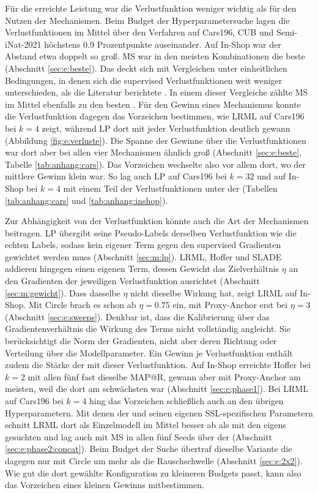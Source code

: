 Für die erreichte Leistung war die Verlustfunktion weniger wichtig als für den Nutzen der Mechanismen. Beim Budget der Hyperparametersuche lagen die Verlustfunktionen im Mittel über den Verfahren auf Cars196, \ac{CUB} und Semi-iNat-2021 höchstens \num{0.9} Prozentpunkte auseinander. Auf In-Shop war der Abstand etwa doppelt so groß. \ac{MS} war in den meisten Kombinationen die beste (Abschnitt \ref{sec:e:beste}). Das deckt sich mit Vergleichen unter einheitlichen Bedingungen, in denen sich die supervised Verlustfunktionen weit weniger unterschieden, als die Literatur berichtete \cite{musgrave_metric_2020, roth_revisiting_2020}. In einem dieser Vergleiche zählte \ac{MS} im Mittel ebenfalls zu den besten \cite{roth_revisiting_2020}. Für den Gewinn eines Mechanismus konnte die Verlustfunktion dagegen das Vorzeichen bestimmen, wie \ac{LRML} auf Cars196 bei $k=4$ zeigt, während \ac{LP} dort mit jeder Verlustfunktion deutlich gewann (Abbildung \ref{fig:e:verluste}). Die Spanne der Gewinne über die Verlustfunktionen war dort aber bei allen vier Mechanismen ähnlich groß (Abschnitt \ref{sec:e:beste}, Tabelle \ref{tab:anhang:cars}). Das Vorzeichen wechselte also vor allem dort, wo der mittlere Gewinn klein war. So lag auch \ac{LP} auf Cars196 bei $k=32$ und auf In-Shop bei $k=4$ mit einem Teil der Verlustfunktionen unter der \UEBL (Tabellen \ref{tab:anhang:cars} und \ref{tab:anhang:inshop}).

Zur Abhängigkeit von der Verlustfunktion könnte auch die Art der Mechanismen beitragen. \ac{LP} übergibt seine Pseudo-Labels derselben Verlustfunktion wie die echten Labels, sodass kein eigener Term gegen den supervised Gradienten gewichtet werden muss (Abschnitt \ref{sec:m:lp}). \ac{LRML}, Hoffer und \ac{SLADE} addieren hingegen einen eigenen Term, dessen Gewicht das Zielverhältnis $\eta$ an den Gradienten der jeweiligen Verlustfunktion ausrichtet (Abschnitt \ref{sec:m:gewicht}). Dass dasselbe $\eta$ nicht dieselbe Wirkung hat, zeigt \ac{LRML} auf In-Shop. Mit Circle brach es schon ab $\eta=\num{0.75}$ ein, mit Proxy-Anchor erst bei $\eta=3$ (Abschnitt \ref{sec:e:sweeps}). Denkbar ist, dass die Kalibrierung über das Gradientenverhältnis die Wirkung des Terms nicht vollständig angleicht. Sie berücksichtigt die Norm der Gradienten, nicht aber deren Richtung oder Verteilung über die Modellparameter. Ein Gewinn je Verlustfunktion enthält zudem die Stärke der \UEBL mit dieser Verlustfunktion. Auf In-Shop erreichte Hoffer bei $k=2$ mit allen fünf fast dieselbe \ac{MAP@R}, gewann aber mit Proxy-Anchor am meisten, weil die \UEBL dort am schwächsten war (Abschnitt \ref{sec:e:phase1}). Bei \ac{LRML} auf Cars196 bei $k=4$ hing das Vorzeichen schließlich auch an den übrigen Hyperparametern. Mit denen der \UEBL und seinen eigenen \ac{SSL}-spezifischen Parametern schnitt \ac{LRML} dort als Einzelmodell im Mittel besser ab als mit den eigens gesuchten und lag auch mit \ac{MS} in allen fünf Seeds über der \UEBL (Abschnitt \ref{sec:e:phase2:concat}). Beim Budget der Suche übertraf dieselbe Variante die \UEBL dagegen nur mit Circle um mehr als die Rauschschwelle (Abschnitt \ref{sec:e:2x2}). Wie gut die dort gewählte Konfiguration zu kleineren Budgets passt, kann also das Vorzeichen eines kleinen Gewinns mitbestimmen.

